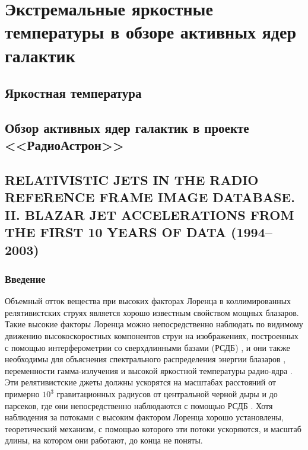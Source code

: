 \graphicspath{{Dissertation/images/chapt3/}}

\chapter{Экстремальные яркостные температуры в обзоре активных ядер галактик} \label{chapt3}

\section{Яркостная температура}

\section{Обзор активных ядер галактик в проекте <<РадиоАстрон>>}


\section{RELATIVISTIC JETS IN THE RADIO REFERENCE FRAME IMAGE DATABASE. II. BLAZAR JET
ACCELERATIONS FROM THE FIRST 10 YEARS OF DATA (1994--2003)}

\subsection{Введение}

Объемный отток вещества при высоких факторах Лоренца в коллимированных релятивистских струях
является хорошо известным свойством мощных блазаров. Такие высокие факторы Лоренца можно
непосредственно наблюдать по видимому движению высокоскоростных компонентов струи на изображениях,
построенных с помощью  интерферометрии со сверхдлинными базами (РСДБ) \cite{Lister_2009b}, и они
также необходимы для объяснения спектрального распределения энергии блазаров \cite{Hartman_2001},
переменности гамма-излучения \cite{Dondi_1995} и высокой яркостной температуры радио-ядра
\cite{Tingay_2001}. Эти релятивистские джеты должны ускорятся на масштабах расстояний от примерно
$10^3$ гравитационных радиусов от центральной черной дыры и до парсеков, где они непосредственно
наблюдаются с помощью РСДБ \cite{Sikora_2005,Vlahakis_2004}. Хотя наблюдения за потоками с высоким
фактором Лоренца хорошо установлены, теоретический механизм, с помощью которого эти потоки
ускоряются, и масштаб длины, на котором они работают, до конца не поняты.

